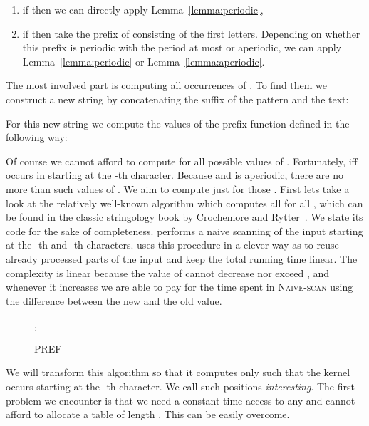 \documentclass[runningheads]{llncs}
\newcommand{\proc}[1]{\textnormal{\scshape#1}}
\begin{document}
\begin{enumerate}
\item if  then we can directly apply Lemma~\ref{lemma:periodic},
\item if  then take the prefix of  consisting of the first  letters. Depending on whether this prefix is periodic with the period at most  or aperiodic, we can apply Lemma~\ref{lemma:periodic} or Lemma~\ref{lemma:aperiodic}.
\end{enumerate}

The most involved part is computing all occurrences of . To find them we construct a new string  by concatenating the suffix of the pattern and the text:

For this new string we compute the values of the prefix function defined in the following way:

Of course we cannot afford to compute  for all possible  values of . Fortunately,  iff  occurs in  
starting at the -th character. Because  and  is aperiodic, there are no more than  such values of . We aim
to compute  just for those . First lets take a look at the relatively well-known algorithm which computes all  for
all , which can be found in the classic stringology book by Crochemore and Rytter~\cite{Jewels}. We state its code for the sake of completeness. 
 performs a naive scanning
of the input starting at the -th and -th characters.  uses this procedure in a clever way as to reuse already processed
parts of the input and keep the total running time linear. The complexity is linear because the value of  cannot decrease nor
exceed , and whenever it increases we are able to pay for the time spent in \proc{Naive-scan} using the difference between the new and the old
value.

\begin{figure*}
\begin{minipage}{\textwidth}
\begin{algorithm}[H]
\caption{\proc{PREF}}
\begin{algorithmic}[1]
\State , 
\For{}\label{line:for starts}
  \State 
  \State 
  \If{}
    \State 
    \If{}
      \State 
    \EndIf
  \ElsIf{}
    \State 
  \Else
    \State  \label{line:access}
    \State 
    \State 
  \EndIf
\EndFor
\State 
\end{algorithmic}
\end{algorithm}
\end{minipage}
\end{figure*}

We will transform this algorithm so that it computes only  such that the kernel occurs starting at the -th character. We call
such positions  \emph{interesting}. The first problem we encounter is that we need a constant time access to any  and cannot afford to allocate a table of length . This can be easily overcome.
\end{document}
